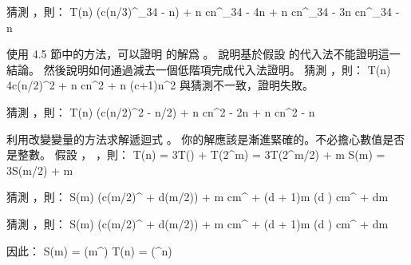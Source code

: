 猜測 ，則：
\startformula\startmathalignment
\NC T(n) \NC {}\Big(c(n/3)^{\log_3{4}} - n\Big) + n \NR
\NC      \NC \le cn^{\log_3{4}} - 4n + n \NR
\NC      \NC \le cn^{\log_3{4}} - 3n \NR
\NC      \NC \le cn^{\log_3{4}} - n \NR
\stopmathalignment\stopformula
\stopANSWER

\startEXERCISE
使用 4.5 節中的方法，可以證明  的解爲 。
說明基於假設  的代入法不能證明這一結論。
然後說明如何通過減去一個低階項完成代入法證明。
\stopEXERCISE
\startANSWER
猜測 ，則：
\startformula\startmathalignment
\NC T(n) \NC \le 4c(n/2)^2 + n \NR
\NC      \NC \le cn^2 + n \NR
\NC      \NC \le (c+1)n^2 \NR
\stopmathalignment\stopformula
與猜測不一致，證明失敗。

猜測 ，則：
\startformula\startmathalignment
\NC T(n) \NC {}\Big(c(n/2)^2 - n/2\Big) + n \NR
\NC      \NC \le cn^2 - 2n + n \NR
\NC      \NC \le cn^2 - n \NR
\stopmathalignment\stopformula
\stopANSWER

\startEXERCISE
利用改變變量的方法求解遞迴式 。
你的解應該是漸進緊確的。不必擔心數值是否是整數。
\stopEXERCISE
\startANSWER
假設 ， ，則：
\startformula\startmathalignment
\NC T(n)   \NC = 3T() +  \NR
\NC T(2^m) \NC = 3T(2^{m/2}) + m \NR
\NC S(m)   \NC = 3S(m/2) + m \NR
\stopmathalignment\stopformula

猜測 ，則：
\startformula\startmathalignment[n=3]
\NC S(m) \NC {}\Big(c(m/2)^{} + d(m/2)\Big) + m \NC \NR
\NC      \NC \le cm^{} + (d + 1)m       \NC (d ) \NR
\NC      \NC \le cm^{} + dm \NC \NR
\stopmathalignment\stopformula

猜測 ，則：
\startformula\startmathalignment[n=3]
\NC S(m) \NC {}\Big(c(m/2)^{} + d(m/2)\Big) + m \NC \NR
\NC      \NC \ge cm^{} + (d + 1)m       \NC (d ) \NR
\NC      \NC \ge cm^{} + dm \NC \NR
\stopmathalignment\stopformula

因此：
\startformula\startmathalignment
\NC S(m) \NC = \Theta(m^{}) \NR
\NC T(n) \NC = \Theta(\lg^{}{n}) \NR
\stopmathalignment\stopformula
\stopANSWER

\stopsection
